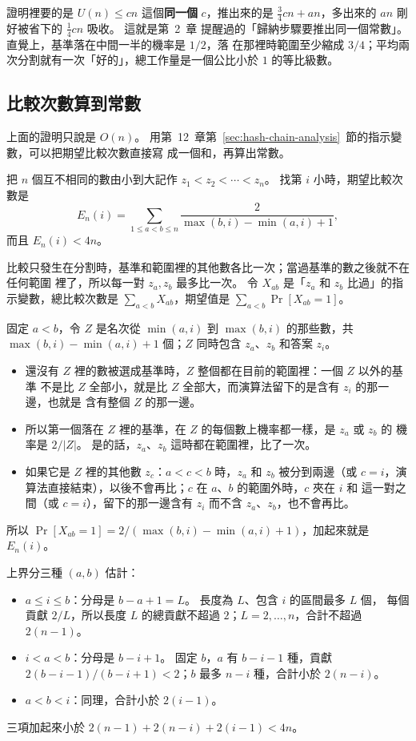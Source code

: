 證明裡要的是 $U(n) \le cn$ 這個\textbf{同一個} $c$，推出來的是
$\frac{3}{4}cn + an$，多出來的 $an$ 剛好被省下的 $\frac{1}{4}cn$ 吸收。 這就是第~2~章
提醒過的「歸納步驟要推出同一個常數」。 直覺上，基準落在中間一半的機率是 $1/2$，落
在那裡時範圍至少縮成 $3/4$；平均兩次分割就有一次「好的」，總工作量是一個公比小於
$1$ 的等比級數。

\subsection{比較次數算到常數}

上面的證明只說是 $O(n)$。 用第~12~章第~\ref{sec:hash-chain-analysis}~節的指示變數，可以把期望比較次數直接寫
成一個和，再算出常數。

\begin{theorem}
\label{thm:sel-rselect-cmp}
把 $n$ 個互不相同的數由小到大記作 $z_1 < z_2 < \cdots < z_n$。
 找第 $i$ 小時，期望比較次數是
\[
E_n(i) = \sum_{1 \le a < b \le n} \frac{2}{\max(b, i) - \min(a, i) + 1},
\]
而且 $E_n(i) < 4n$。
\end{theorem}

\begin{whybox}[期望比較次數]
比較只發生在分割時，基準和範圍裡的其他數各比一次；當過基準的數之後就不在任何範圍
裡了，所以每一對 $z_a, z_b$ 最多比一次。 令 $X_{ab}$ 是「$z_a$ 和 $z_b$ 比過」的指
示變數，總比較次數是 $\sum_{a<b} X_{ab}$，期望值是 $\sum_{a<b} \Pr[X_{ab} = 1]$。

固定 $a < b$，令 $Z$ 是名次從 $\min(a, i)$ 到 $\max(b, i)$ 的那些數，共
$\max(b, i) - \min(a, i) + 1$ 個；$Z$ 同時包含 $z_a$、$z_b$ 和答案 $z_i$。
\begin{itemize}
\item 還沒有 $Z$ 裡的數被選成基準時，$Z$ 整個都在目前的範圍裡：一個 $Z$ 以外的基準
不是比 $Z$ 全部小，就是比 $Z$ 全部大，而演算法留下的是含有 $z_i$ 的那一邊，也就是
含有整個 $Z$ 的那一邊。
\item 所以第一個落在 $Z$ 裡的基準，在 $Z$ 的每個數上機率都一樣，是 $z_a$ 或 $z_b$ 的
機率是 $2/|Z|$。 是的話，$z_a$、$z_b$ 這時都在範圍裡，比了一次。
\item 如果它是 $Z$ 裡的其他數 $z_c$：$a < c < b$ 時，$z_a$ 和 $z_b$ 被分到兩邊（或
$c = i$，演算法直接結束），以後不會再比；$c$ 在 $a$、$b$ 的範圍外時，$c$ 夾在 $i$ 和
這一對之間（或 $c = i$），留下的那一邊含有 $z_i$ 而不含 $z_a$、$z_b$，也不會再比。
\end{itemize}
所以 $\Pr[X_{ab} = 1] = 2/(\max(b,i) - \min(a,i) + 1)$，加起來就是 $E_n(i)$。

上界分三種 $(a, b)$ 估計：
\begin{itemize}
\item $a \le i \le b$：分母是 $b - a + 1 = L$。 長度為 $L$、包含 $i$ 的區間最多 $L$ 個，
每個貢獻 $2/L$，所以長度 $L$ 的總貢獻不超過 $2$；$L = 2, \ldots, n$，合計不超過
$2(n - 1)$。
\item $i < a < b$：分母是 $b - i + 1$。 固定 $b$，$a$ 有 $b - i - 1$ 種，貢獻
$2(b - i - 1)/(b - i + 1) < 2$；$b$ 最多 $n - i$ 種，合計小於 $2(n - i)$。
\item $a < b < i$：同理，合計小於 $2(i - 1)$。
\end{itemize}
三項加起來小於 $2(n-1) + 2(n-i) + 2(i-1) < 4n$。
\end{whybox}

